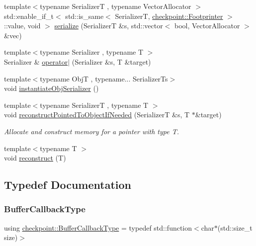 \begin{DoxyCompactItemize}
\item 
{\footnotesize template$<$typename SerializerT , typename Vector\+Allocator $>$ }\\std\+::enable\+\_\+if\+\_\+t$<$ std\+::is\+\_\+same$<$ SerializerT, \hyperlink{structcheckpoint_1_1_footprinter}{checkpoint\+::\+Footprinter} $>$\+::value, void $>$ \hyperlink{namespacecheckpoint_af95ab4d3ad37bb33b284e3a51047d685}{serialize} (SerializerT \&s, std\+::vector$<$ bool, Vector\+Allocator $>$ \&vec)
\item 
{\footnotesize template$<$typename Serializer , typename T $>$ }\\Serializer \& \hyperlink{namespacecheckpoint_a5c9a1c4d05ec6880270c9a6d0dded825}{operator$\vert$} (Serializer \&s, T \&target)
\item 
{\footnotesize template$<$typename ObjT , typename... Serializer\+Ts$>$ }\\void \hyperlink{namespacecheckpoint_a09875c2d3c012be868f3fd88b3ed55be}{instantiate\+Obj\+Serializer} ()
\item 
{\footnotesize template$<$typename SerializerT , typename T $>$ }\\void \hyperlink{namespacecheckpoint_a9ffb72abb4d8c3fe031626dbf526d70c}{reconstruct\+Pointed\+To\+Object\+If\+Needed} (SerializerT \&s, T $\ast$\&target)
\begin{DoxyCompactList}\small\item\em Allocate and construct memory for a pointer with type {\ttfamily T}. \end{DoxyCompactList}\item 
{\footnotesize template$<$typename T $>$ }\\void \hyperlink{namespacecheckpoint_a6254f2e220f905a2b0c797c08092a7a1}{reconstruct} (T)
\end{DoxyCompactItemize}


\subsection{Typedef Documentation}
\mbox{\label{namespacecheckpoint_a70bc1b37eae8e32129df38d981ef90f6}} 
\subsubsection{\texorpdfstring{Buffer\+Callback\+Type}{BufferCallbackType}}
{\footnotesize\ttfamily using \hyperlink{namespacecheckpoint_a70bc1b37eae8e32129df38d981ef90f6}{checkpoint\+::\+Buffer\+Callback\+Type} = typedef std\+::function$<$char$\ast$(std\+::size\+\_\+t size)$>$}



